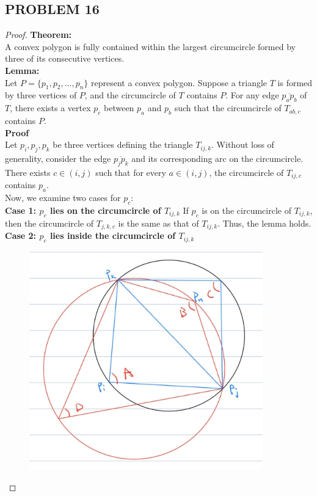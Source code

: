 \documentclass{article}
\begin{document}
\newpage

\subsection*{PROBLEM 16}

\begin{proof}
    \textbf{Theorem: }
    \\
    A convex polygon is fully contained within the largest circumcircle formed by three of its consecutive vertices.
    \\
    \textbf{Lemma: }
    \\
    Let \( P = \{p_1, p_2, \ldots, p_n\} \) represent a convex polygon. Suppose a triangle \( T \) is formed by three vertices of \( P \), and the circumcircle of \( T \) contains \( P \). For any edge \( \overline{p_a p_b} \) of \( T \), there exists a vertex \( p_c \) between \( p_a \) and \( p_b \) such that the circumcircle of \( T_{ab,c} \) contains \( P \).
    \\
    \textbf{Proof}
    \\
    Let \( p_i, p_j, p_k \) be three vertices defining the triangle \( T_{ij,k} \). Without loss of generality, consider the edge \( \overline{p_jp_k} \) and its corresponding arc on the circumcircle. There exists \( c \in (i, j) \) such that for every \( a \in (i, j) \), the circumcircle of \( T_{ij,c} \) contains \( p_a \).
    \\
    Now, we examine two cases for \( p_c \):
    \\
    \textbf{Case 1: \( p_c \) lies on the circumcircle of \( T_{ij,k} \)}
    If \( p_c \) is on the circumcircle of \( T_{ij,k} \), then the circumcircle of \( T_{j,k,c} \) is the same as that of \( T_{ij,k} \). Thus, the lemma holds.
    \\
    \textbf{Case 2: \( p_c \) lies inside the circumcircle of \( T_{ij,k} \)}
    \begin{figure}[h]
        \centering
        \includegraphics[width=0.9\textwidth]{HW5_Q2_Proof_Helper_Graph.png}

\end{figure}
\end{proof}
\end{document}
